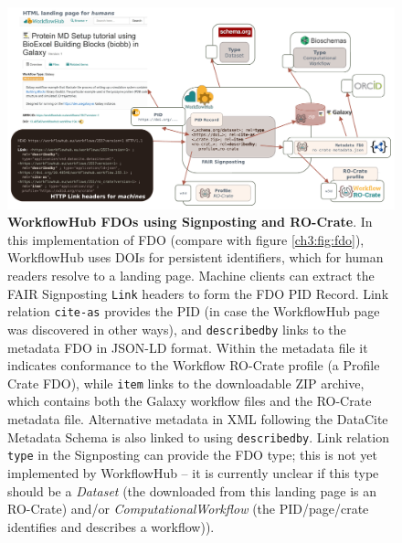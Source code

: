 \begin{figure}[htb]
  \includegraphics[width=\textwidth]{figures/ch09/signposting.pdf}
    \caption[WorkflowHub FDOs using Signposting and RO-Crate]{\textbf{WorkflowHub FDOs using Signposting and RO-Crate}. In this implementation of FDO (compare with figure \vref{ch3:fig:fdo}), WorkflowHub uses DOIs for persistent identifiers, which for human readers resolve to a landing page. Machine clients can extract the FAIR Signposting \texttt{Link} headers \cite{Van de Sompel 2022} to form the FDO PID Record. Link relation \texttt{cite-as} provides the PID \cite{Bayarri 2022} (in case the WorkflowHub page was discovered in other ways), and \texttt{describedby} links to the metadata FDO in JSON-LD format. Within the metadata file it indicates conformance to the Workflow RO-Crate profile (a Profile Crate FDO), while \texttt{item} links to the downloadable ZIP archive, which contains both the Galaxy workflow files and the RO-Crate metadata file. Alternative metadata in XML following the DataCite Metadata Schema is also linked to using \texttt{describedby}. Link relation \texttt{type} in the Signposting can provide the FDO type; this is not yet implemented by WorkflowHub -- it is currently unclear if this type should be a \emph{Dataset} (the downloaded from this landing page is an RO-Crate) and/or \emph{ComputationalWorkflow} (the PID/page/crate identifies and describes a workflow)).
    }
  \label{ch9:fig:signposting}
\end{figure}
